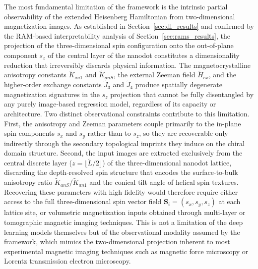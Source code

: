 \documentclass[final,5p,times,twocolumn]{elsarticle}
\begin{document}
The most fundamental limitation of the framework is the intrinsic
partial observability of the extended Heisenberg Hamiltonian from
two-dimensional magnetization images. As established in
Section~\ref{sec:dl_results} and confirmed by the
RAM-based interpretability analysis of
Section~\ref{sec:rams_results}, the projection of the
three-dimensional spin configuration onto the out-of-plane component
$s_z$ of the central layer of the nanodot constitutes a
dimensionality reduction that irreversibly discards physical
information. The magnetocrystalline anisotropy constants
$\tilde{K}_{an1}$ and $\tilde{K}_{anS}$, the external Zeeman field
$\tilde{H}_{ex}$, and the higher-order exchange constants
$\tilde{J}_3$ and $\tilde{J}_4$ produce spatially degenerate
magnetization signatures in the $s_z$ projection that cannot be
fully disentangled by any purely image-based regression model,
regardless of its capacity or architecture. Two distinct
observational constraints contribute to this limitation. First, the
anisotropy and Zeeman parameters couple primarily to the in-plane
spin components $s_x$ and $s_y$ rather than to $s_z$, so they are
recoverable only indirectly through the secondary topological
imprints they induce on the chiral domain structure. Second, the
input images are extracted exclusively from the central discrete
layer ($z = \lfloor \breve{L}/2 \rfloor$) of the three-dimensional
nanodot lattice, discarding the depth-resolved spin structure that
encodes the surface-to-bulk anisotropy ratio
$\tilde{K}_{anS}/\tilde{K}_{an1}$ and the conical tilt angle of
helical spin textures. Recovering these parameters with high
fidelity would therefore require either access to the full
three-dimensional spin vector field $\mathbf{S}_i = (s_x, s_y, s_z)$
at each lattice site, or volumetric magnetization inputs obtained
through multi-layer or tomographic magnetic imaging techniques. This
is not a limitation of the deep learning models themselves but of
the observational modality assumed by the framework, which mimics
the two-dimensional projection inherent to most experimental
magnetic imaging techniques such as magnetic force microscopy or
Lorentz transmission electron microscopy.
\end{document}
